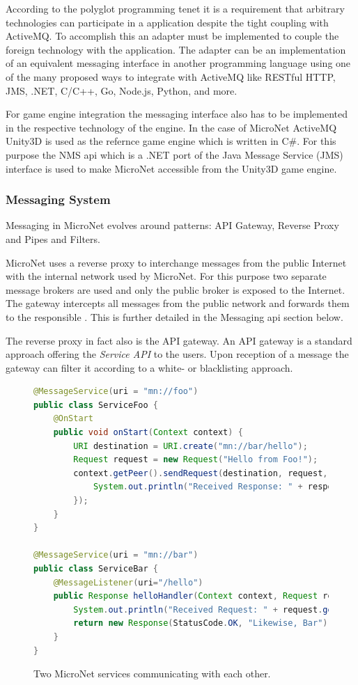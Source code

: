 According to the polyglot programming tenet it is a requirement that arbitrary
technologies can participate in a \ms{} application despite the tight coupling
with ActiveMQ. To accomplish this an adapter must be implemented to couple the
foreign technology with the application. The adapter can be an
implementation of an equivalent messaging interface in another programming
language using one of the many proposed ways to integrate with ActiveMQ like
RESTful HTTP, JMS, .NET, C/C++, Go, Node.js, Python, and more.

For game engine integration the messaging interface also has to be implemented
in the respective technology of the engine. In the case of MicroNet ActiveMQ
Unity3D is used as the refernce game engine which is written in C\#. For this
purpose the NMS \gls{api} which is a .NET port of the Java Message Service (JMS)
interface is used to make MicroNet accessible from the Unity3D game engine.

\subsubsection{Messaging System}

Messaging in MicroNet evolves around patterns: API Gateway, Reverse Proxy and
Pipes and Filters.

MicroNet uses a reverse proxy to interchange messages from the public Internet
with the internal network used by MicroNet. For this purpose two separate
message brokers are used and only the public broker is exposed to the Internet.
The gateway intercepts all messages from the public network and forwards them to
the responsible \ms{}. This is further detailed in the Messaging \gls{api} section
below.

The reverse proxy in fact also is the API gateway. An API gateway is a standard
approach offering the \textit{Service API} to the users. Upon reception of a
message the gateway can filter it according to a white- or blacklisting approach.

\begin{figure}
\begin{lstlisting}[language=Java,firstnumber=1] 
@MessageService(uri = "mn://foo")
public class ServiceFoo {
	@OnStart
	public void onStart(Context context) {
		URI destination = URI.create("mn://bar/hello");
		Request request = new Request("Hello from Foo!");
		context.getPeer().sendRequest(destination, request, response -> {
			System.out.println("Received Response: " + response.getData());
		});
	}
}

@MessageService(uri = "mn://bar")
public class ServiceBar {
	@MessageListener(uri="/hello")
	public Response helloHandler(Context context, Request request) {
		System.out.println("Received Request: " + request.getData());
		return new Response(StatusCode.OK, "Likewise, Bar");
	}
}
\end{lstlisting}
\caption{Two MicroNet services communicating with each other.}
\label{lst:service_communication}
\end{figure}

